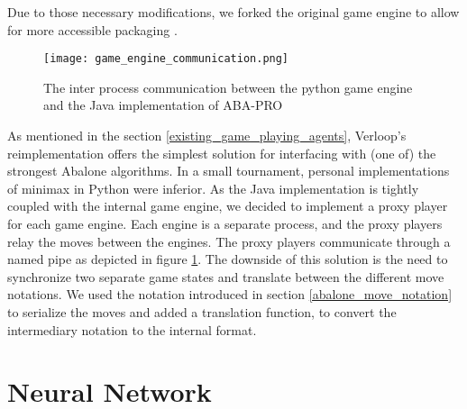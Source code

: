 Due to those necessary modifications, we forked the original game engine to allow for more accessible packaging \cite{claussen_campfiremanabalone-boai_2021}.

\begin{figure}
    \centering
    \texttt{[image: game\_engine\_communication.png]}
    \caption{The inter process communication between the python game engine and the Java implementation of ABA-PRO}
    \label{python_java_ipc}
\end{figure}

As mentioned in the section \ref{existing_game_playing_agents}, Verloop's reimplementation \cite{verloop_abaloneai_nodate} offers the simplest solution for interfacing with (one of) the strongest Abalone algorithms. In a small tournament, personal implementations of minimax in Python \cite{claussen_abalone_2021} were inferior. As the Java implementation is tightly coupled with the internal game engine, we decided to implement a proxy player for each game engine. Each engine is a separate process, and the proxy players relay the moves between the engines. The proxy players communicate through a named pipe as depicted in figure \ref{python_java_ipc}. The downside of this solution is the need to synchronize two separate game states and translate between the different move notations. We used the notation introduced in section \ref{abalone_move_notation} to serialize the moves and added a translation function, to convert the intermediary notation to the internal format.

\section{Neural Network}
